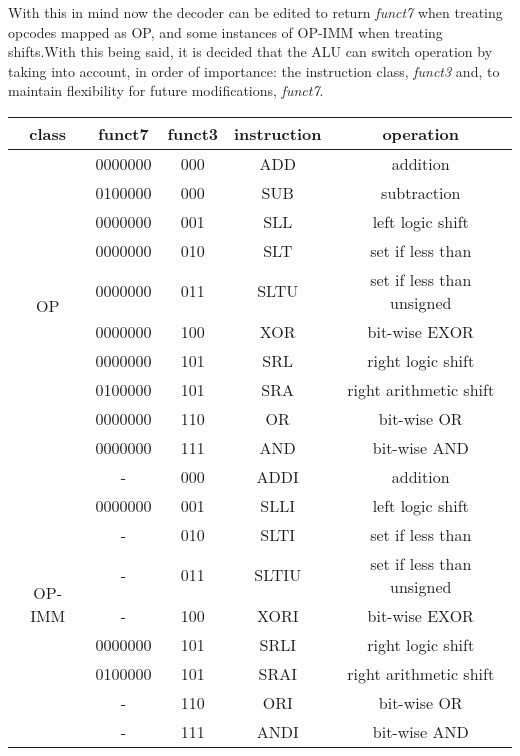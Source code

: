 With this in mind now the decoder can be edited to return \emph{funct7} when treating opcodes mapped as OP, and some instances of OP-IMM when treating shifts.With this being said, it is decided that the ALU can switch operation by taking into account, in order of importance: the instruction class, \emph{funct3} and, to maintain flexibility for future modifications, \emph{funct7}.

\begin{table}[h!]
    \begin{center}
        \begin{tabular}{|c|c|c|c|c|}
            \hline
            class & funct7 & funct3 & instruction & operation \\
            \hline
            \multirow{10}{*}{OP} & 0000000 & 000 & ADD & addition\\
            & 0100000 & 000 & SUB & subtraction\\
            & 0000000 & 001 & SLL & left logic shift\\
            & 0000000 & 010 & SLT & set if less than\\
            & 0000000 & 011 & SLTU & set if less than unsigned\\
            & 0000000 & 100 & XOR & bit-wise EXOR\\
            & 0000000 & 101 & SRL & right logic shift\\
            & 0100000 & 101 & SRA & right arithmetic shift\\
            & 0000000 & 110 & OR & bit-wise OR\\
            & 0000000 & 111 & AND & bit-wise AND\\
            \hline
            \multirow{9}{*}{OP-IMM} & - & 000 & ADDI & addition\\
            & 0000000 & 001 & SLLI & left logic shift\\
            & - & 010 & SLTI & set if less than\\
            & - & 011 & SLTIU & set if less than unsigned\\
            & - & 100 & XORI & bit-wise EXOR\\
            & 0000000 & 101 & SRLI & right logic shift\\
            & 0100000 & 101 & SRAI & right arithmetic shift\\
            & - & 110 & ORI & bit-wise OR\\
            & - & 111 & ANDI & bit-wise AND\\
            \hline

\end{tabular}
\end{center}
\end{table}
